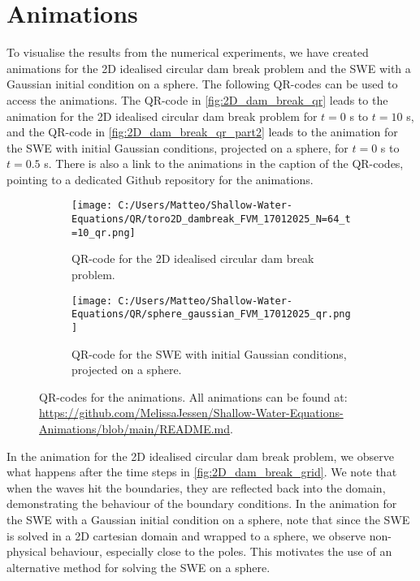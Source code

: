 \section{Animations}\label{sec:animations}
To visualise the results from the numerical experiments, we have created animations for the 2D idealised circular dam break problem and the SWE with a Gaussian initial condition on a sphere.
The following QR-codes can be used to access the animations.
The QR-code in \autoref{fig:2D_dam_break_qr} leads to the animation for the 2D idealised circular dam break problem for $t=0$ s to $t = 10$ s, and the QR-code in \autoref{fig:2D_dam_break_qr_part2} leads to the animation for the SWE with initial Gaussian conditions, projected on a sphere, for $t=0$ s to $t = 0.5$ s.
There is also a link to the animations in the caption of the QR-codes, pointing to a dedicated Github repository for the animations.
\begin{figure}[H]
    \centering
    \begin{subfigure}{0.35\textwidth}
        \centering
        \texttt{[image: C:/Users/Matteo/Shallow-Water-Equations/QR/toro2D\_dambreak\_FVM\_17012025\_N=64\_t=10\_qr.png]}
        \caption{QR-code for the 2D idealised circular dam break problem.}\label{fig:2D_dam_break_qr}
    \end{subfigure}
    \hspace{1cm}
    \begin{subfigure}{0.35\textwidth}
        \centering
        \texttt{[image: C:/Users/Matteo/Shallow-Water-Equations/QR/sphere\_gaussian\_FVM\_17012025\_qr.png]}
        \caption{QR-code for the SWE with initial Gaussian conditions, projected on a sphere.}\label{fig:2D_dam_break_qr_part2}
    \end{subfigure}
    \caption{QR-codes for the animations.
            All animations can be found at: \url{https://github.com/MelissaJessen/Shallow-Water-Equations-Animations/blob/main/README.md}.}\label{fig:2D_dam_break_qr_all}
\end{figure}
In the animation for the 2D idealised circular dam break problem, we observe what happens after the time steps in \autoref{fig:2D_dam_break_grid}.
We note that when the waves hit the boundaries, they are reflected back into the domain, demonstrating the behaviour of the boundary conditions.
In the animation for the SWE with a Gaussian initial condition on a sphere, note that since the SWE is solved in a 2D cartesian domain and wrapped to a sphere, we observe non-physical behaviour, especially close to the poles.
This motivates the use of an alternative method for solving the SWE on a sphere.



